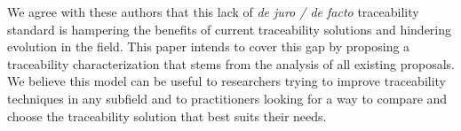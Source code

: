 We agree with these authors that this lack of \textit{de juro / de facto} traceability standard is hampering the benefits of current traceability solutions and hindering evolution in the field. This paper intends to cover this gap by proposing a traceability characterization that stems from the analysis of all existing proposals. We believe this model can be useful to researchers trying to improve traceability techniques in any subfield and to practitioners looking for a way to compare and choose the traceability solution that best suits their needs. 
















